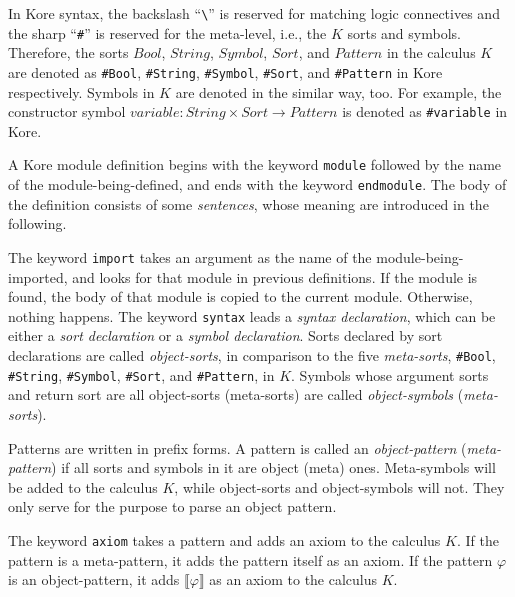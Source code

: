 \documentclass[UTF8]{article}
\theoremstyle{plain}
\theoremstyle{definition}
\theoremstyle{remark}
\newcommand{\Bracket}[1]
    {\llbracket#1\rrbracket}
\begin{document}
In Kore syntax, the backslash ``\verb|\|'' is reserved for matching logic connectives and the sharp ``\verb|#|'' is reserved for the meta-level, i.e., the $K$ sorts and symbols. 
Therefore, the sorts $\mathit{Bool}$, $\mathit{String}$, $\mathit{Symbol}$, $\mathit{Sort}$, and $\mathit{Pattern}$ in the calculus $K$ are denoted as \verb|#Bool|, \verb|#String|, \verb|#Symbol|, \verb|#Sort|, and \verb|#Pattern| in Kore respectively.
Symbols in $K$ are denoted in the similar way, too. 
For example, the constructor symbol $\mathit{variable} \colon \mathit{String} \times \mathit{Sort} \to \mathit{Pattern}$ is denoted as \verb|#variable| in Kore. 

A Kore module definition begins with the keyword \verb|module| followed by the name of the module-being-defined, and ends with the keyword \verb|endmodule|. The body of the definition consists of some \emph{sentences}, whose meaning are introduced in the following.

The keyword \verb|import| takes an argument as the name of the module-being-imported, and looks for that module in previous definitions. 
If the module is found, the body of that module is copied to the current module.
Otherwise, nothing happens. 
The keyword \verb|syntax| leads a \emph{syntax declaration}, which can be either a \emph{sort declaration} or a \emph{symbol declaration}.
Sorts declared by sort declarations are called \emph{object-sorts}, in comparison to the five \emph{meta-sorts}, \verb|#Bool|, \verb|#String|, \verb|#Symbol|, \verb|#Sort|, and \verb|#Pattern|, in $K$. 
Symbols whose argument sorts and return sort are all object-sorts (meta-sorts) are called \emph{object-symbols} (\emph{meta-sorts}).

Patterns are written in prefix forms. 
A pattern is called an \emph{object-pattern} (\emph{meta-pattern}) if all sorts and symbols in it are object (meta) ones.
Meta-symbols will be added to the calculus $K$, while object-sorts and object-symbols will not.
They only serve for the purpose to parse an object pattern. 

The keyword \verb|axiom| takes a pattern and adds an axiom to the calculus $K$.
If the pattern is a meta-pattern, it adds the pattern itself as an axiom.
If the pattern $\varphi$ is an object-pattern, it adds $\Bracket{\varphi}$ as an axiom to the calculus $K$.
\end{document}
